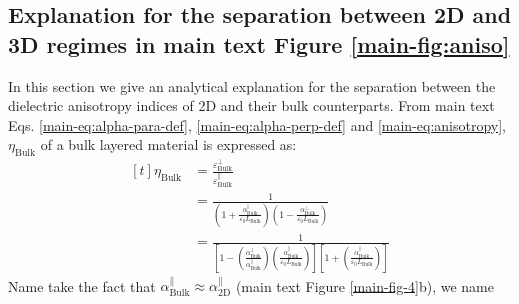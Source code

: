 \documentclass[journal=ancac3,email=true,hyperref=true,keywords=false]{achemso}
\begin{document}
\subsection{Explanation for the separation between 2D and 3D regimes in main text Figure \ref{main-fig:aniso}}
\label{sssec:aniso-2}
In this section we give an analytical explanation for the separation
between the dielectric anisotropy indices of 2D and their bulk
counterparts. From main text Eqs. \ref{main-eq:alpha-para-def},
\ref{main-eq:alpha-perp-def} and \ref{main-eq:anisotropy},
$\eta_{\mathrm{Bulk}}$ of a bulk layered material is expressed as:
\begin{equation}
  \label{eq:eta-bulk}
  \begin{aligned}[t]
    \eta_{\mathrm{Bulk}} &= \frac{\varepsilon_{\mathrm{Bulk}}^{\perp}}
    {\varepsilon_{\mathrm{Bulk}}^{\parallel}}\\
    &= \frac{1}{\left(1 + {\displaystyle
          \frac{\alpha_{\mathrm{Bulk}}^{\parallel}}{\varepsilon_{0}L_{\mathrm{Bulk}}}}\right)
      \left(1 - {\displaystyle \frac{\alpha_{\mathrm{Bulk}}^{\perp}}{\varepsilon_{0}L_{\mathrm{Bulk}}}} \right)}\\
    &= \frac{1}{ \left[1-\left( {\displaystyle
            \frac{\alpha_{\mathrm{Bulk}}^{\perp}}{\alpha_{\mathrm{Bulk}}^{\parallel}}}\right)
        \left(
          {\displaystyle \frac{\alpha_{\mathrm{Bulk}}^{\parallel}}{\varepsilon_{0}
            L_{\mathrm{Bulk}}}} \right) \right]
      \left[ 1 + \left(
          {\displaystyle \frac{\alpha_{\mathrm{Bulk}}^{\parallel}}{\varepsilon_{0}
            L_{\mathrm{Bulk}}}} \right)\right]
    }
  \end{aligned}
\end{equation}
Name take the fact that
$\alpha_{\mathrm{Bulk}}^{\parallel} \approx
\alpha^{\parallel}_{\mathrm{2D}}$ (main text Figure
\ref{main-fig-4}b), we name
\end{document}
